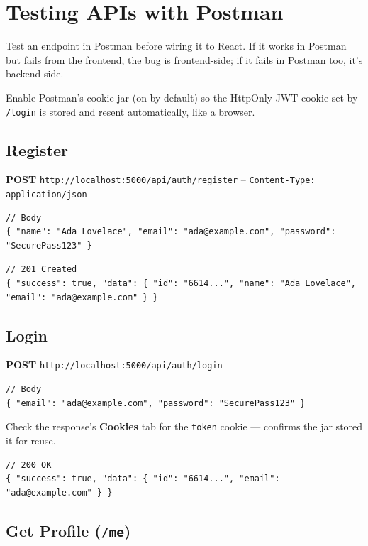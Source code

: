 \chapter{Testing APIs with Postman}

Test an endpoint in Postman before wiring it to React. If it works in
Postman but fails from the frontend, the bug is frontend-side; if it fails
in Postman too, it's backend-side.

\begin{notebox}[NOTE]
Enable Postman's cookie jar (on by default) so the HttpOnly JWT cookie set
by \texttt{/login} is stored and resent automatically, like a browser.
\end{notebox}

\section{Register}

\textbf{POST} \texttt{http://localhost:5000/api/auth/register} --
\texttt{Content-Type: application/json}

\begin{lstlisting}
// Body
{ "name": "Ada Lovelace", "email": "ada@example.com", "password": "SecurePass123" }
\end{lstlisting}

\begin{lstlisting}
// 201 Created
{ "success": true, "data": { "id": "6614...", "name": "Ada Lovelace", "email": "ada@example.com" } }
\end{lstlisting}

\section{Login}

\textbf{POST} \texttt{http://localhost:5000/api/auth/login}

\begin{lstlisting}
// Body
{ "email": "ada@example.com", "password": "SecurePass123" }
\end{lstlisting}

Check the response's \textbf{Cookies} tab for the \texttt{token} cookie ---
confirms the jar stored it for reuse.

\begin{lstlisting}
// 200 OK
{ "success": true, "data": { "id": "6614...", "email": "ada@example.com" } }
\end{lstlisting}

\section{Get Profile (\texttt{/me})}

